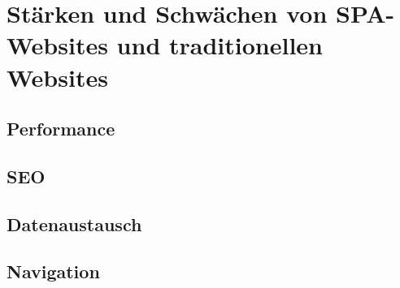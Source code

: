 \section{Stärken und Schwächen von SPA-Websites und traditionellen Websites}
\subsection{Performance}
\subsection{SEO}
\subsection{Datenaustausch}
\subsection{Navigation}